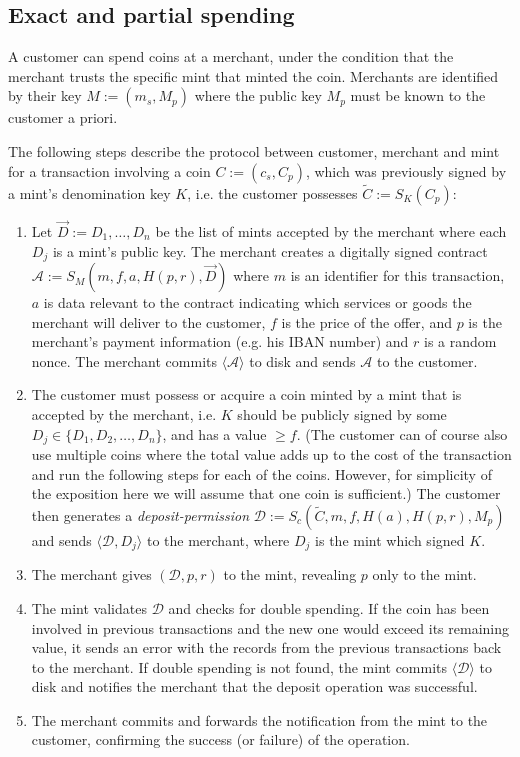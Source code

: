 \documentclass{llncs}
\begin{document}
\subsection{Exact and partial spending}

A customer can spend coins at a merchant, under the condition that the
merchant trusts the specific mint that minted the coin.  Merchants are
identified by their key $M := (m_s, M_p)$ where the public key $M_p$
must be known to the customer a priori.

The following steps describe the protocol between customer, merchant and mint
for a transaction involving a coin $C := (c_s, C_p)$, which was previously signed
by a mint's denomination key $K$, i.e. the customer possesses
$\widetilde{C} := S_K(C_p)$:

\begin{enumerate}
\item\label{contract} Let $\vec{D} := D_1, \ldots, D_n$ be the list of
  mints accepted by the merchant where each $D_j$ is a mint's public
  key.  The merchant creates a digitally signed contract $\mathcal{A}
  := S_M(m, f, a, H(p, r), \vec{D})$ where $m$ is an identifier for this
  transaction, $a$ is data relevant to the contract indicating which services
  or goods the merchant will deliver to the customer, $f$ is the price of the offer,
  and $p$ is the merchant's payment information (e.g. his IBAN number) and $r$ is
  a random nonce.  The merchant commits $\langle \mathcal{A}
  \rangle$ to disk and sends $\mathcal{A}$ to the customer.
\item\label{deposit} The customer must possess or acquire a coin minted by a mint that is
  accepted by the merchant, i.e. $K$ should be publicly signed by some $D_j
  \in \{D_1, D_2, \ldots, D_n\}$, and has a value $\geq f$. (The customer
  can of course also use multiple coins where the total value adds up to
  the cost of the transaction and run the following steps for each of
  the coins. However, for simplicity of the exposition here we will
  assume that one coin is sufficient.)
%
  The customer then generates a \emph{deposit-permission} $\mathcal{D} :=
  S_c(\widetilde{C}, m, f, H(a), H(p,r), M_p)$
  and sends $\langle \mathcal{D}, D_j\rangle$ to the merchant,
  where $D_j$ is the mint which signed $K$.
\item The merchant gives $(\mathcal{D}, p, r)$ to the mint, revealing $p$
  only to the mint.

\item The mint validates $\mathcal{D}$ and checks for double spending.
  If the coin has been involved in previous transactions and the new
  one would exceed its remaining value, it sends an error
  with the records from the previous transactions back to the merchant.
%
  If double spending is not found, the mint commits $\langle \mathcal{D} \rangle$ to disk
  and notifies the merchant that the deposit operation was successful.

\item The merchant commits and forwards the notification from the mint to the
  customer, confirming the success (or failure) of the operation.
\end{enumerate}
\end{document}
